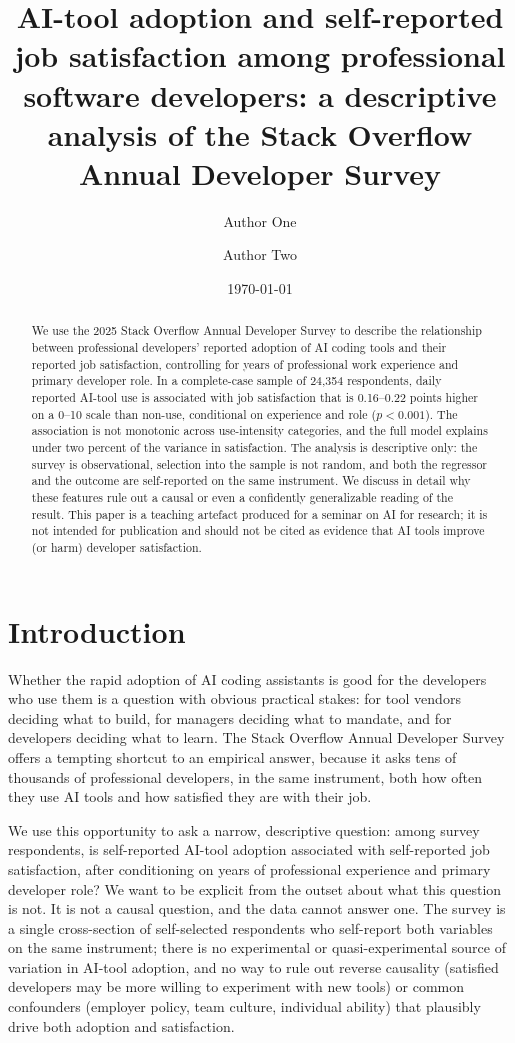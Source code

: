 \documentclass[11pt]{article}
\title{AI-tool adoption and self-reported job satisfaction among professional
software developers: a descriptive analysis of the Stack Overflow Annual
Developer Survey}
\author[1]{Author One}
\author[1]{Author Two}
\affil[1]{Universidade Cat\'olica Portuguesa}
\date{\today}
\begin{document}
\maketitle

\begin{abstract}
We use the 2025 Stack Overflow Annual Developer Survey to describe the
relationship between professional developers' reported adoption of AI coding
tools and their reported job satisfaction, controlling for years of
professional work experience and primary developer role. In a complete-case
sample of 24,354 respondents, daily reported AI-tool use is associated with
job satisfaction that is 0.16--0.22 points higher on a 0--10 scale than
non-use, conditional on experience and role ($p<0.001$). The association is
not monotonic across use-intensity categories, and the full model explains
under two percent of the variance in satisfaction. The analysis is
descriptive only: the survey is observational, selection into the sample is
not random, and both the regressor and the outcome are self-reported on the
same instrument. We discuss in detail why these features rule out a causal
or even a confidently generalizable reading of the result. This paper is a
teaching artefact produced for a seminar on AI for research; it is not
intended for publication and should not be cited as evidence that AI tools
improve (or harm) developer satisfaction.
\end{abstract}

\section{Introduction}

Whether the rapid adoption of AI coding assistants is good for the developers
who use them is a question with obvious practical stakes: for tool vendors
deciding what to build, for managers deciding what to mandate, and for
developers deciding what to learn. The Stack Overflow Annual Developer
Survey offers a tempting shortcut to an empirical answer, because it asks
tens of thousands of professional developers, in the same instrument, both
how often they use AI tools and how satisfied they are with their job.

We use this opportunity to ask a narrow, descriptive question: among
survey respondents, is self-reported AI-tool adoption associated with
self-reported job satisfaction, after conditioning on years of professional
experience and primary developer role? We want to be explicit from the
outset about what this question is not. It is not a causal question, and
the data cannot answer one. The survey is a single cross-section of
self-selected respondents who self-report both variables on the same
instrument; there is no experimental or quasi-experimental source of
variation in AI-tool adoption, and no way to rule out reverse causality
(satisfied developers may be more willing to experiment with new tools)
or common confounders (employer policy, team culture, individual ability)
that plausibly drive both adoption and satisfaction.
\end{document}
